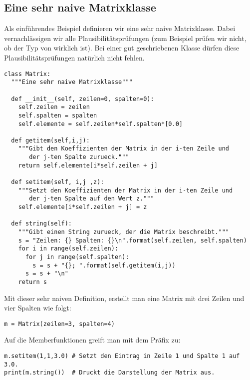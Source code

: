 \subsection{Eine sehr naive Matrixklasse}
\label{section:klassen:eine_sehr_naive_matrixklasse}
Als einführendes Beispiel definieren wir eine sehr naive Matrixklasse.
Dabei vernachlässigen wir alle Plausibilitätsprüfungen
(zum Beispiel prüfen wir nicht, ob der Typ von  wirklich  ist).
Bei einer gut geschriebenen Klasse dürfen diese Plausibilitätsprüfungen natürlich nicht fehlen.
\begin{lstlisting}
class Matrix:
  """Eine sehr naive Matrixklasse"""
  
  def __init__(self, zeilen=0, spalten=0):
    self.zeilen = zeilen
    self.spalten = spalten
    self.elemente = self.zeilen*self.spalten*[0.0]
  
  def getitem(self,i,j):
    """Gibt den Koeffizienten der Matrix in der i-ten Zeile und
       der j-ten Spalte zurueck."""
    return self.elemente[i*self.zeilen + j]
  
  def setitem(self, i,j ,z):
    """Setzt den Koeffizienten der Matrix in der i-ten Zeile und
       der j-ten Spalte auf den Wert z."""
    self.elemente[i*self.zeilen + j] = z
  
  def string(self):
    """Gibt einen String zurueck, der die Matrix beschreibt."""
    s = "Zeilen: {} Spalten: {}\n".format(self.zeilen, self.spalten)
    for i in range(self.zeilen):
      for j in range(self.spalten):
        s = s + "{}; ".format(self.getitem(i,j))
      s = s + "\n"
    return s
\end{lstlisting}
Mit dieser sehr naiven Definition, erstellt man eine Matrix mit drei Zeilen und vier Spalten wie folgt:
\begin{lstlisting}
m = Matrix(zeilen=3, spalten=4)
\end{lstlisting}
Auf die Memberfunktionen greift man mit dem Präfix  zu:
\begin{lstlisting}
m.setitem(1,1,3.0) # Setzt den Eintrag in Zeile 1 und Spalte 1 auf 3.0.
print(m.string())  # Druckt die Darstellung der Matrix aus.
\end{lstlisting}
